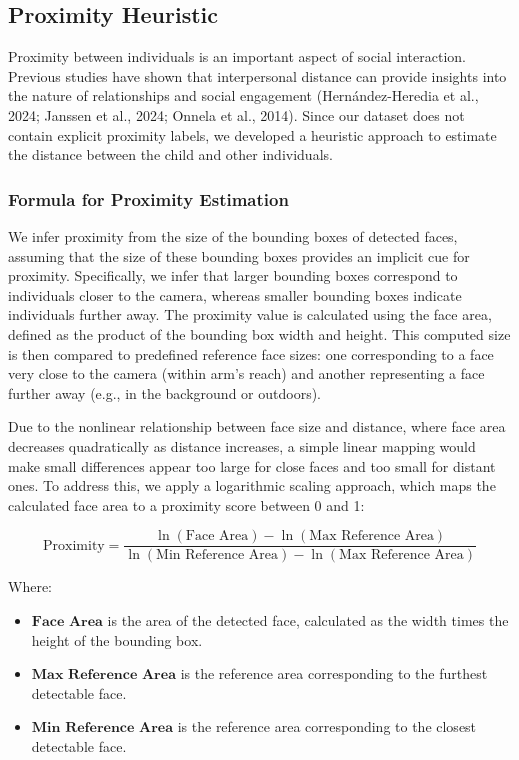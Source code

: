 \documentclass[
  man,floatsintext]{apa6}
\providecommand{\tightlist}{%
  \setlength{\itemsep}{0pt}\setlength{\parskip}{0pt}}
\begin{document}
\subsection{Proximity Heuristic}\label{sup-proximity}

Proximity between individuals is an important aspect of social interaction. Previous studies have shown that interpersonal distance can provide insights into the nature of relationships and social engagement (Hernández-Heredia et al., 2024; Janssen et al., 2024; Onnela et al., 2014). Since our dataset does not contain explicit proximity labels, we developed a heuristic approach to estimate the distance between the child and other individuals.

\subsubsection{Formula for Proximity Estimation}\label{formula-for-proximity-estimation-1}

We infer proximity from the size of the bounding boxes of detected faces, assuming that the size of these bounding boxes provides an implicit cue for proximity. Specifically, we infer that larger bounding boxes correspond to individuals closer to the camera, whereas smaller bounding boxes indicate individuals further away. The proximity value is calculated using the face area, defined as the product of the bounding box width and height. This computed size is then compared to predefined reference face sizes: one corresponding to a face very close to the camera (within arm's reach) and another representing a face further away (e.g., in the background or outdoors).

Due to the nonlinear relationship between face size and distance, where face area decreases quadratically as distance increases, a simple linear mapping would make small differences appear too large for close faces and too small for distant ones. To address this, we apply a logarithmic scaling approach, which maps the calculated face area to a proximity score between 0 and 1:

\[
\text{Proximity} = \frac{\ln(\text{Face Area}) - \ln(\text{Max Reference Area})}{\ln(\text{Min Reference Area}) - \ln(\text{Max Reference Area})}
\]

Where:

\begin{itemize}
\tightlist
\item
  \(\textbf{Face Area}\) is the area of the detected face, calculated as the width times the height of the bounding box.
\item
  \(\textbf{Max Reference Area}\) is the reference area corresponding to the furthest detectable face.
\item
  \(\textbf{Min Reference Area}\) is the reference area corresponding to the closest detectable face.
\end{itemize}
\end{document}
